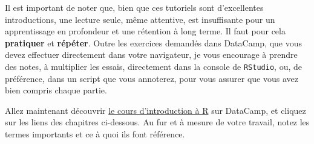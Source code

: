 \documentclass[
  letterpaper,
  DIV=11,
  numbers=noendperiod]{scrreprt}
\begin{document}
Il est important de noter que, bien que ces tutoriels sont d'excellentes
introductions, une lecture seule, même attentive, est insuffisante pour
un apprentissage en profondeur et une rétention à long terme. Il faut
pour cela \textbf{pratiquer} et \textbf{répéter}. Outre les exercices
demandés dans DataCamp, que vous devez effectuer directement dans votre
navigateur, je vous encourage à prendre des notes, à multiplier les
essais, directement dans la console de \texttt{RStudio}, ou, de
préférence, dans un script que vous annoterez, pour vous assurer que
vous avez bien compris chaque partie.

Allez maintenant découvrir
\href{https://www.datacamp.com/community/open-courses/introduction-a-r}{le
cours d'introduction à R} sur DataCamp, et cliquez sur les liens des
chapitres ci-dessous. Au fur et à mesure de votre travail, notez les
termes importants et ce à quoi ils font référence.
\end{document}
